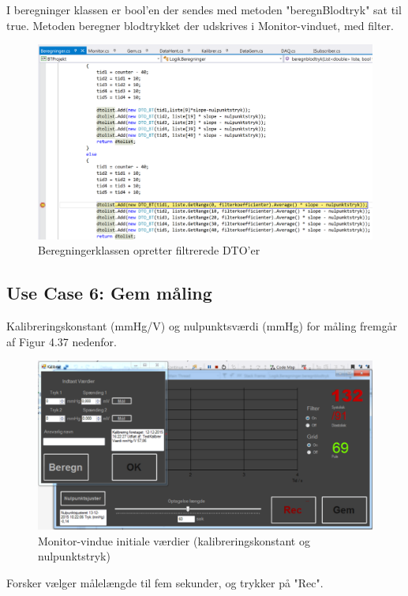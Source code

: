 I beregninger klassen er bool'en der sendes med metoden "beregnBlodtryk" sat til true. Metoden beregner blodtrykket der udskrives i Monitor-vinduet, med filter.

\begin{figure}[H]
	\centering
	\includegraphics[width=1\textwidth]{Figurer/Test_Aktiver_4}
	\caption{Beregningerklassen opretter filtrerede DTO'er}
\end{figure}

\subsection{Use Case 6: Gem måling}
Kalibreringskonstant (mmHg/V) og nulpunktsværdi (mmHg) for måling fremgår af Figur 4.37 nedenfor.
\begin{figure}[H]
	\centering
	\includegraphics[width=1\textwidth]{Figurer/UC6_InitialConditions}
	\caption{Monitor-vindue initiale værdier (kalibreringskonstant og nulpunktstryk)}
\end{figure}
 
 Forsker vælger målelængde til fem sekunder, og trykker på "Rec".
 
